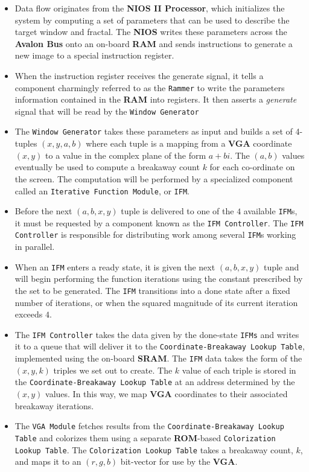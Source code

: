 \documentclass{article}
\begin{document}
\begin{itemize} 

\item Data flow originates from the \textbf{NIOS II Processor}, which initializes the system
by computing a set of parameters that can be used to describe the target window and 
fractal. The \textbf{NIOS} writes these parameters across the \textbf{Avalon Bus} onto an on-board \textbf{RAM} 
and sends instructions to generate a new image to a special instruction register.

\item When the instruction register receives the generate signal, it tells a component
charmingly referred to as the \texttt{Rammer} to write the parameters information contained 
in the \textbf{RAM} into registers. It then asserts a \textit{generate} signal that will be read by 
the \texttt{Window Generator}


\item The \texttt{Window Generator} takes these parameters as input and builds a set of 4-tuples $(x, y, a, b)$ where
  each tuple is a mapping from a \textbf{VGA} coordinate $(x, y)$ to a value in
  the complex plane of the form $a+bi$. The $(a, b)$ values eventually be used to compute a breakaway count $k$ for
  each co-ordinate on the screen. The computation will be performed by a specialized component called an 
  \texttt{Iterative Function Module}, or \texttt{IFM}.

\item Before the next $(a, b, x, y)$ tuple is delivered to one of the $4$ available \texttt{IFM}s, it must be requested by a component
known as the \texttt{IFM Controller}. The \texttt{IFM Controller} is responsible for distributing work among
several \texttt{IFM}s working in parallel. 

\item When an \texttt{IFM} enters a ready state, it is given the next $(a, b, x, y)$ tuple and will begin performing
the function iterations using the constant prescribed by the set to be generated. The \texttt{IFM} transitions into a 
done state after a fixed number of iterations, or when the squared magnitude of its current iteration exceeds $4$.

\item The \texttt{IFM Controller} takes the data given by the done-state \texttt{IFMs} and writes it to a queue
that will deliver it to the \texttt{Coordinate-Breakaway Lookup Table}, implemented using the on-board \textbf{SRAM}. 
The \texttt{IFM} data takes the form of the $(x, y, k)$ triples we set out to create. The $k$ value of each triple
is stored in the \texttt{Coordinate-Breakaway Lookup Table} at an address determined by the $(x, y)$ values. In this 
way, we map \textbf{VGA} coordinates to their associated breakaway iterations.

\item The \texttt{VGA Module} fetches results from the \texttt{Coordinate-Breakaway
  Lookup Table} and colorizes them using a separate \textbf{ROM}-based \texttt{Colorization Lookup Table}.
  The \texttt{Colorization Lookup Table} takes a breakaway count, $k$, and maps it to an $(r, g, b)$ bit-vector for use by the \textbf{VGA}.
\end{itemize}
\end{document}
